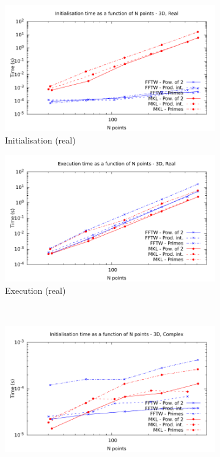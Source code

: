 \documentclass[12pt, a4paper]{article} \setlength{\textheight}{24cm}
\begin{document}
\begin{figure}[H]
  \centering
  \begin{subfigure}{.5\textwidth}
    \centering
    \includegraphics[width=.9\linewidth]{graphs/3d-init-r.pdf}
    \caption{Initialisation (real)}
    \label{3DRI}
  \end{subfigure}%
  \begin{subfigure}{.5\textwidth}
    \centering
    \includegraphics[width=.9\linewidth]{graphs/3d-exec-r.pdf}
    \caption{Execution (real)}
    \label{3DR}
  \end{subfigure}\\
  \begin{subfigure}{.5\textwidth}
    \centering
    \includegraphics[width=.9\linewidth]{graphs/3d-init-c.pdf}

\end{subfigure}
\end{figure}
\end{document}
